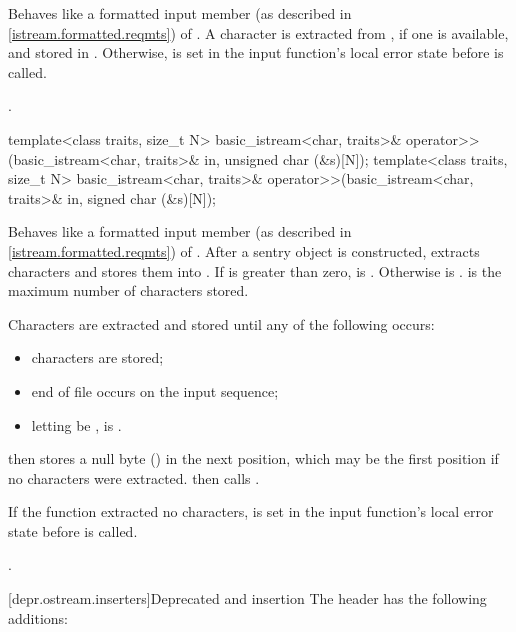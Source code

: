 \begin{itemdescr}
\pnum
\effects
Behaves like a formatted input member
(as described in \ref{istream.formatted.reqmts})
of .
A character is extracted from ,
if one is available, and stored in .
Otherwise,  is set
in the input function's local error state
before  is called.

\pnum
\returns
{}.
\end{itemdescr}

\pnum
\begin{itemdecl}
template<class traits, size_t N>
  basic_istream<char, traits>& operator>>(basic_istream<char, traits>& in, unsigned char (&s)[N]);
template<class traits, size_t N>
  basic_istream<char, traits>& operator>>(basic_istream<char, traits>& in, signed char (&s)[N]);
\end{itemdecl}

\begin{itemdescr}
\pnum
\effects
Behaves like a formatted input member
(as described in \ref{istream.formatted.reqmts})
of .
After a sentry object is constructed,
 extracts characters and stores them into .
If  is greater than zero,
 is .
Otherwise  is .
 is the maximum number of characters stored.

\pnum
Characters are extracted and stored until any of the following occurs:
\begin{itemize}
\item {} characters are stored;
\item end of file occurs on the input sequence;
\item letting  be , 
      is .
\end{itemize}

\pnum
{} then stores a null byte () in the next position,
which may be the first position if no characters were extracted.
 then calls .

\pnum
If the function extracted no characters,
 is set in the input function's
local error state before  is called.

\pnum
\returns
{}.
\end{itemdescr}

[depr.ostream.inserters]{Deprecated  and  insertion}
\pnum
The header  has the following additions:

